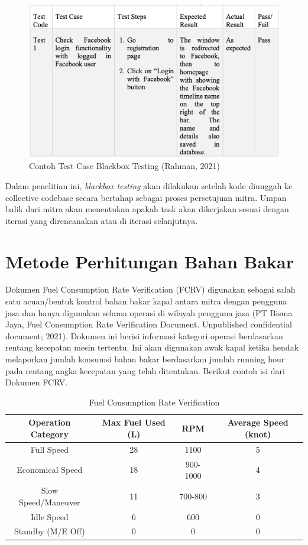 \begin{figure}[!h]
    \includegraphics[width=.8\linewidth, center]{images/tinjauan-pustaka/fig-blackbox-eg.png}
    \caption{Contoh Test Case Blackbox Testing (Rahman, 2021)}
    \label{fig:blackbox-example}
\end{figure}

Dalam penelitian ini, \textit{blackbox testing} akan dilakukan setelah kode diunggah ke collective codebase secara bertahap sebagai proses persetujuan mitra. Umpan balik dari mitra akan menentukan apakah task akan dikerjakan sesuai dengan iterasi yang direncanakan atau di iterasi selanjutnya.

\section{Metode Perhitungan Bahan Bakar}

\noindent Dokumen Fuel Consumption Rate Verification (FCRV) digunakan sebagai salah satu acuan/bentuk kontrol bahan bakar kapal antara mitra dengan pengguna jasa dan hanya digunakan selama operasi di wilayah pengguna jasa (PT Bisma Jaya, Fuel Consumption Rate Verification Document. Unpublished confidential document; 2021). Dokumen ini berisi informasi kategori operasi berdasarkan rentang kecepatan mesin tertentu. Ini akan digunakan awak kapal ketika hendak melaporkan jumlah konsumsi bahan bakar berdasarkan jumlah running hour pada rentang angka kecepatan yang telah ditentukan. Berikut contoh isi dari Dokumen FCRV.

\newpage

\begin{table}[!h]
    \caption{ Fuel Consumption Rate Verification}
    \centering
     \begin{tabular}{c c c c}
        \toprule
        Operation Category &
        Max Fuel Used (L) &
        RPM &
        Average Speed (knot) \\ [0.5ex]
        \midrule
        Full Speed          & 28    & 1100      & 5 \\
        Economical Speed    & 18    & 900-1000  & 4 \\
        Slow Speed/Maneuver & 11    & 700-800   & 3 \\
        Idle Speed          & 6     & 600       & 0 \\
        Standby (M/E Off)   & 0     & 0         & 0 \\ [1ex]
        \bottomrule
    \end{tabular}
     \label{tab:fcrv}
\end{table}

